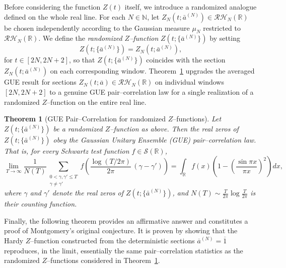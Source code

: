 \documentclass[12pt,reqno]{amsart}
\theoremstyle{plain}
\newtheorem{mainthm}{Theorem}
\theoremstyle{definition}
\theoremstyle{remark}
\begin{document}
Before considering the function \(Z(t)\) itself, we introduce a randomized analogue 
defined on the whole real line.  
For each \(N \in \mathbb{N}\), let 
\(Z_N(t; \bar a^{(N)}) \in \mathcal{RH}_N(\mathbb{R})\) 
be chosen independently according to the Gaussian measure \(\mu_N\) 
restricted to \(\mathcal{RH}_N(\mathbb{R})\).  
We define the \emph{randomized $Z$--function} $Z(t ; \{ \bar a^{(N)} \})$ by setting 
\begin{equation}
Z(t ; \{ \bar a^{(N)} \}) = Z_N(t; \bar a^{(N)}),
\end{equation}
for $t \in [2N,2N+2]$, so that \(Z(t ; \{ \bar a^{(N)} \})\) coincides with the section 
\(Z_N(t; \bar a^{(N)})\) on each corresponding window. Theorem~\ref{thm:B1} upgrades the averaged GUE result for sections
\(Z_N(t;\overline{a}) \in \mathcal{RH}_N(\mathbb{R})\) on individual windows
\([2N,2N+2]\) to a genuine GUE pair--correlation law for a single realization of a
randomized $Z$--function on the entire real line.


\begin{mainthm}[GUE Pair--Correlation for randomized $Z$--functions]
\label{thm:B1}
Let \(Z(t ; \{ \bar a^{(N)} \})\) be a randomized $Z$--function as above.  
Then the real zeros of \(Z(t ; \{ \bar a^{(N)} \})\) obey the 
Gaussian Unitary Ensemble (GUE) pair--correlation law.  
That is, for every Schwartz test function \(f \in \mathcal{S}(\mathbb{R})\),
\begin{equation}\label{eq:PCC-thmB}
\lim_{T \to \infty}
\frac{1}{N(T)}
\!\!\sum_{\substack{0<\gamma,\gamma'\le T\\\gamma\ne\gamma'}}
f\!\left(
\frac{\log(T/2\pi)}{2\pi}\,(\gamma-\gamma')
\right)
=
\int_{\mathbb{R}} 
f(x)
\!\left(
1-\left(\frac{\sin\pi x}{\pi x}\right)^{\!2}
\right)
dx,
\end{equation}
where \(\gamma\) and \(\gamma'\) denote the real zeros of 
\(Z(t ; \{ \bar a^{(N)} \})\), and 
\(N(T)\sim \tfrac{T}{2\pi}\log\!\tfrac{T}{2\pi}\) 
is their counting function.
\end{mainthm}

   Finally, the following theorem provides an affirmative answer and constitutes a proof of Montgomery’s original conjecture. It is proven by showing that the Hardy 
\(Z\)–function constructed from the deterministic sections 
\(\overline{a}^{(N)} = \overline{1}\) reproduces, in the limit, essentially the same  
pair–correlation statistics as the randomized 
\(Z\)–functions considered in Theorem~\ref{thm:B1}. 
\end{document}

